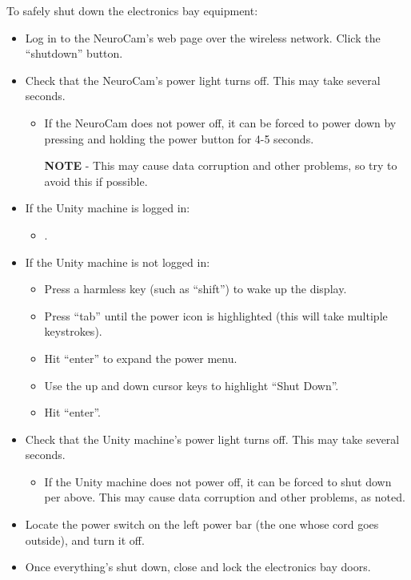 \clearpage
To safely shut down the electronics bay equipment:

\begin{itemize}
%
\item Log in to the NeuroCam's web page over the wireless network. Click
the ``shutdown'' button.
%
\item Check that the NeuroCam's power light turns off. This may take
several seconds.

\begin{itemize}
\item If the NeuroCam does not power off, it can be forced to power down by
pressing and holding the power button for 4-5 seconds.

\textbf{NOTE} - This may cause data corruption and other problems, so try to
avoid this if possible.
\end{itemize}
%
\item If the Unity machine is logged in:
\begin{itemize}
\item {}.
\end{itemize}
%
\item If the Unity machine is not logged in:
\begin{itemize}
\item Press a harmless key (such as ``shift'') to wake up the display.
\item Press ``tab'' until the power icon is highlighted (this will take 
multiple keystrokes).
\item Hit ``enter'' to expand the power menu.
\item Use the up and down cursor keys to highlight ``Shut Down''.
\item Hit ``enter''.
\end{itemize}
%
\item Check that the Unity machine's power light turns off. This may take
several seconds.

\begin{itemize}
\item If the Unity machine does not power off, it can be forced to shut down
per above. This may cause data corruption and other problems, as noted.
\end{itemize}
%
\item Locate the power switch on the left power bar (the one whose cord
goes outside), and turn it off.
%
\item Once everything's shut down, close and lock the electronics bay doors.
%
\end{itemize}

%
